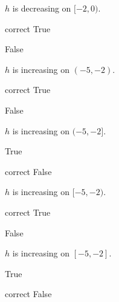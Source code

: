 \documentclass{ximera}
\begin{document}
\begin{exercise}
\begin{question}
$h$ is decreasing on $[-2,0)$.

\begin{multipleChoice}
\item [correct]{True}
\item {False}
\end{multipleChoice}

\end{question}






\begin{question}
$h$ is increasing on $(-5,-2)$.

\begin{multipleChoice}
\item [correct]{True}
\item {False}
\end{multipleChoice}

\end{question}






\begin{question}
$h$ is increasing on $(-5,-2]$.

\begin{multipleChoice}
\item {True}
\item [correct]{False}
\end{multipleChoice}

\end{question}









\begin{question}
$h$ is increasing on $[-5,-2)$.

\begin{multipleChoice}
\item [correct]{True}
\item {False}
\end{multipleChoice}

\end{question}






\begin{question}
$h$ is increasing on $[-5,-2]$.

\begin{multipleChoice}
\item {True}
\item [correct]{False}
\end{multipleChoice}


\end{question}
\end{exercise}
\end{document}
